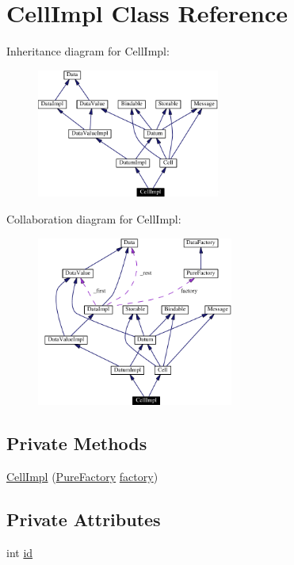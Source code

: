 \hypertarget{classCellImpl}{
\section{Cell\-Impl  Class Reference}
\label{classCellImpl}
}
Inheritance diagram for Cell\-Impl:\begin{figure}[H]
\begin{center}
\leavevmode
\includegraphics[width=170pt]{classCellImpl__inherit__graph}
\end{center}
\end{figure}
Collaboration diagram for Cell\-Impl:\begin{figure}[H]
\begin{center}
\leavevmode
\includegraphics[width=183pt]{classCellImpl__coll__graph}
\end{center}
\end{figure}
\subsection*{Private Methods}
\begin{CompactItemize}
\item 
\hyperlink{classCellImpl_c0}{Cell\-Impl} (\hyperlink{classPureFactory}{Pure\-Factory} \hyperlink{classDataImpl_o0}{factory})
\end{CompactItemize}
\subsection*{Private Attributes}
\begin{CompactItemize}
\item 
int \hyperlink{classCellImpl_o0}{id}
\end{CompactItemize}
